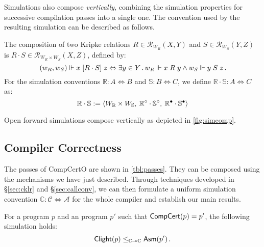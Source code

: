 \documentclass[sigplan,screen]{acmart}
\begin{document}
Simulations also compose \emph{vertically},
combining the
simulation properties for successive compilation passes
into a single one.
The convention used by the resulting simulation
can be described as follows.

\begin{definition} %
The composition of two Kripke relations
$R \in \mathcal{R}_{W_R}(X, Y)$ and
$S \in \mathcal{R}_{W_S}(Y, Z)$
is %
$R \cdot S \in \mathcal{R}_{W_R \times W_S}(X, Z)$,
defined by:
\[
  (w_R, w_S) \Vdash x \mathrel{[{R \cdot S}]} z \Leftrightarrow
  \exists y \in Y \,.\,
    w_R \Vdash x \mathrel{R} y \wedge
    w_S \Vdash y \mathrel{S} z \,.
\]
For the simulation conventions
$\mathbb{R} : A \Leftrightarrow B$ and
$\mathbb{S} : B \Leftrightarrow C$,
we define
$\mathbb{R} \cdot \mathbb{S} : A \Leftrightarrow C$ as:
\[
  \mathbb{R} \cdot \mathbb{S} :=
  \langle
    W_\mathbb{R} \times W_\mathbb{S}, \:
    \mathbb{R}^\circ \cdot \mathbb{S}^\circ, \:
    \mathbb{R}^\bullet \cdot \mathbb{S}^\bullet
  \rangle
\]
\end{definition}

\begin{theorem} \label{thm:fsim-vcomp} %
Open forward simulations compose vertically
as depicted in \autoref{fig:simcomp}.
\end{theorem}



\subsection{Compiler Correctness} \label{sec:comppass} %

The passes of CompCertO are shown in \autoref{tbl:passes}.
They can be composed using the mechanisms we have just described.
Through techniques developed in \S\ref{sec:cklr} and \S\ref{sec:callconv},
we can then formulate
a uniform simulation convention
$\mathbb{C} : \mathcal{C} \Leftrightarrow \mathcal{A}$
for the whole compiler
and establish our main results.

\begin{theorem} \label{thm:compc} %
For a  program $p$
and an  program $p'$ such that
$ \mathsf{CompCert} (p) = p'$,
the following simulation holds:
\[
     \mathsf{Clight} (p) \le_{\mathbb{C} \twoheadrightarrow \mathbb{C}}
     \mathsf{Asm} (p') \,.
\]
\end{theorem}
\end{document}
